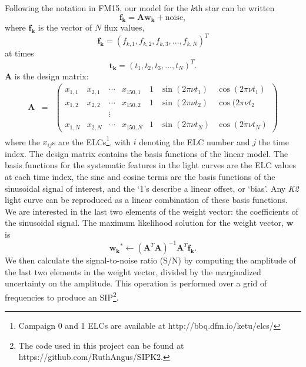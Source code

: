 \documentclass[useAMS, usenatbib, preprint, 12pt]{aastex}
\begin{document}
Following the notation in FM15, our model for the $k$th star can be written
\begin{equation}
	\mathbf{f_k} = \mathbf{A}\mathbf{w_k} + \mathrm{noise},
\end{equation}
where $\mathbf{f_k}$ is the vector of $N$ flux values,
\begin{equation}
	\mathbf{f_k} = (f_{k,1}, f_{k,2}, f_{k,3}, ..., f_{k,N})^T
\end{equation}
at times
\begin{equation}
	\mathbf{t_k} = (t_1, t_2, t_3, ..., t_N)^T.
\end{equation}
$\mathbf{A}$ is the design matrix:
\begin{eqnarray}
	\mathbf{A} &=& \left (\begin{array}{ccccccc}
	x_{1,1} & x_{2,1} & \cdots & x_{150,1} & 1 & \sin(2\pi\nu t_1) & \cos(2\pi\nu t_1) \\
	x_{1,2} & x_{2,2} & \cdots & x_{150,2} & 1 & \sin(2\pi\nu t_2) & \cos(2\pi\nu t_2\\
    && \vdots &&&\\
	x_{1,N} & x_{2,N} & \cdots & x_{150,N} & 1 & \sin(2\pi\nu t_N) & \cos(2\pi\nu t_N)
\end{array}\right )
\end{eqnarray}
where the $x_{ij}$s are the ELCs\footnote{Campaign 0 and 1 ELCs are
available at http://bbq.dfm.io/ketu/elcs/}, with $i$ denoting the ELC number
and $j$ the time index.
The design matrix contains the basis functions of the linear model.
The basis functions for the systematic features in the light curves are the ELC
values at each time index, the sine and cosine terms are the basis functions of
the sinusoidal signal of interest, and the `1's describe a linear offset, or
`bias'.
Any {\it K2} light curve can be reproduced as a linear combination of these
basis functions.
We are interested in the last two elements of the weight vector: the
coefficients of the sinusoidal signal.
The maximum likelihood solution for the weight vector,
$\mathbf{w}$ is
\begin{equation}
	\mathbf{w_k}^* \gets (\mathbf{A}^T\mathbf{A})^{-1}\mathbf{A}^T\mathbf{f_k}.
\end{equation}
We then calculate the signal-to-noise ratio (S/N) by computing
the amplitude of the last two elements in the weight vector,
divided by the marginalized uncertainty on the amplitude.
This operation is performed over a grid of frequencies to produce an
SIP\footnote{The code used in this project can be found at
https://github.com/RuthAngus/SIPK2.}.
\end{document}
